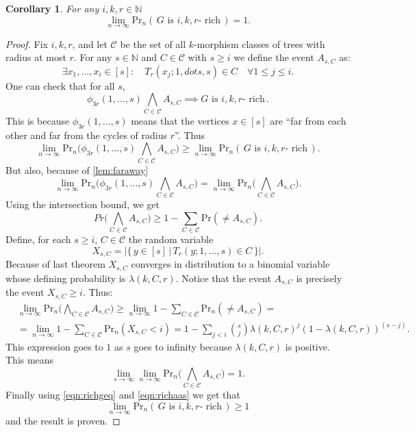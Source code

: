 \documentclass[11pt,notitlepage,a4paper]{article}
\newtheorem{corollary}{Corollary}[section]
\theoremstyle{definition}
\newcommand{\N}{\mathbb{N}}
\newcommand{\Ln}{\lim\limits_{n\to \infty}}
\begin{document}
\begin{corollary} \label{thm:rich}
	For any $i,k,r\in \N$
	\[\Ln \mathrm{Pr}_n(\, G \text{ is } i,k,r\text{- rich}\,)=1.\]
\end{corollary}
\begin{proof}
	Fix $i,k,r$, and let $\mathcal{C}$ be the set of all
	$k$-morphism classes of trees with radius at most $r$.
	For any $s\in \N$ and $C\in \mathcal{C}$ with $s\geq i$ we define
	the event $A_{s,C}$ as:
	\[ \exists x_1, \dots, x_i \in [s]: \quad T_r(x_j;1,dots, s)\in C \quad
	\forall 1\leq j \leq i.\] 
	One can check that for all $s$, 
	\[ \phi_{3r}(1,\dots, s) \bigwedge_{C\in \mathcal{C}} A_{s,C}
	\implies  G \text{ is } i,k,r\text{- rich}\, .\]
	This is because  $\phi_{3r}(1,\dots, s)$ means that the
	vertices $x\in [s]$ are ``far from each other and far from 
	the cycles of radius $r$''. Thus
	\begin{equation}\label{eqn:richgeq}
	\Ln \mathrm{Pr}_n\Bigg(\phi_{3r}(1,\dots, s) 
	\bigwedge_{C\in \mathcal{C}} A_{s,C}\Bigg)
	\geq \Ln \mathrm{Pr}_n(\, G \text{ is } i,k,r\text{- rich}\,).
	\end{equation}
	But also, because of \cref{lem:faraway}
	\begin{equation} \label{eqn:richaas}
	\Ln \mathrm{Pr}_n\Bigg(\phi_{3r}(1,\dots, s) 
	\bigwedge_{C\in \mathcal{C}} A_{s,C}\Bigg)=
	\Ln \mathrm{Pr}_n\Bigg( 
	\bigwedge_{C\in \mathcal{C}} A_{s,C}\Bigg).
	\end{equation}
	Using the intersection bound, we get
	\[ Pr\Bigg( 
	\bigwedge_{C\in \mathcal{C}} A_{s,C}\Bigg)\geq
	1- \sum_{C\in\mathcal{C}} \mathrm{Pr}(\neq A_{s,C}).\]
	Define, for each $s\geq i$, $C\in \mathcal{C}$ the
	random variable
	\[ X_{s,C}=|\{ \, y\in [s] \, | \, T_r(y; 1,\dots, s)\in C \,   \}|.\]
	Because of last theorem $X_{s,C}$ converges in distribution
	to a binomial variable whose defining probability is $\lambda(k,C,r)$. 
	Notice that the event $A_{s,C}$ is precisely the event
	$X_{s,C}\geq i$. Thus:
	\begin{align*}
	 &\Ln \mathrm{Pr}_n\Bigg( 
	\bigwedge_{C\in \mathcal{C}} A_{s,C}\Bigg)\geq
	\Ln 1- \sum_{C\in\mathcal{C}} \mathrm{Pr}_n(\neq A_{s,C})=\\
	&=\Ln 1- \sum_{C\in\mathcal{C}} \mathrm{Pr}_n(X_{s,C}<i)=
	1- \sum_{j<i} \binom{s}{j}\lambda(k,C,r)^j(1-\lambda(k,C,r))^{(s-j)}.
	\end{align*}
	This expression goes to $1$ as $s$ goes to infinity because
	$\lambda(k,C,r)$ is positive. This means 
	\[ \lim\limits_{s\to \infty} \Ln \mathrm{Pr}_n\Bigg( 
	\bigwedge_{C\in \mathcal{C}} A_{s,C}\Bigg)=1. \]
	Finally using \cref{eqn:richgeq} and \cref{eqn:richaas} 
	we get that 
	\[\Ln \mathrm{Pr}_n(\, G \text{ is } i,k,r\text{- rich}\,)\geq 1\]
	and the result is proven.
\end{proof}
\end{document}
